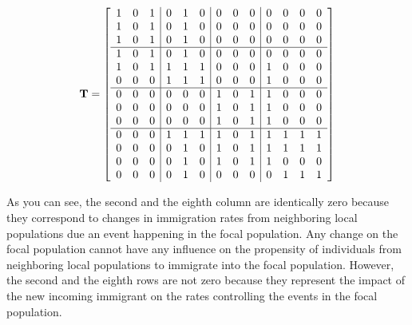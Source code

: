 \begin{equation}
{\bf T} = 
\left[ \begin{array}{ccc|ccc|ccc|cccc}
1 & 0 & 1  & 0 & 1 & 0  & 0 & 0 & 0  & 0 & 0 & 0 & 0 \\
1 & 0 & 1  & 0 & 1 & 0  & 0 & 0 & 0  & 0 & 0 & 0 & 0 \\
1 & 0 & 1  & 0 & 1 & 0  & 0 & 0 & 0  & 0 & 0 & 0 & 0 \\
\hline
1 & 0 & 1  & 0 & 1 & 0  & 0 & 0 & 0  & 0 & 0 & 0 & 0 \\
1 & 0 & 1  & 1 & 1 & 1  & 0 & 0 & 0  & 1 & 0 & 0 & 0 \\
0 & 0 & 0  & 1 & 1 & 1  & 0 & 0 & 0  & 1 & 0 & 0 & 0 \\
\hline
0 & 0 & 0  & 0 & 0 & 0  & 1 & 0 & 1  & 1 & 0 & 0 & 0 \\
0 & 0 & 0  & 0 & 0 & 0  & 1 & 0 & 1  & 1 & 0 & 0 & 0 \\
0 & 0 & 0  & 0 & 0 & 0  & 1 & 0 & 1  & 1 & 0 & 0 & 0 \\
\hline
0 & 0 & 0  & 1 & 1 & 1  & 1 & 0 & 1  & 1 & 1 & 1 & 1 \\
0 & 0 & 0  & 0 & 1 & 0  & 1 & 0 & 1  & 1 & 1 & 1 & 1 \\
0 & 0 & 0  & 0 & 1 & 0  & 1 & 0 & 1  & 1 & 0 & 0 & 0 \\
0 & 0 & 0  & 0 & 1 & 0  & 0 & 0 & 0  & 0 & 1 & 1 & 1 \\
\end{array}
\right]
\label{T_E}
\end{equation}

As you can see, the second and the eighth column are identically zero because they correspond to changes in immigration rates from neighboring local populations due an event happening in the focal population. Any change on the focal population cannot have any influence on the propensity of individuals from neighboring local populations to immigrate into the focal population. However, the second and the eighth rows are not zero because they represent the impact of the new incoming immigrant on the rates controlling the events in the focal population.  

